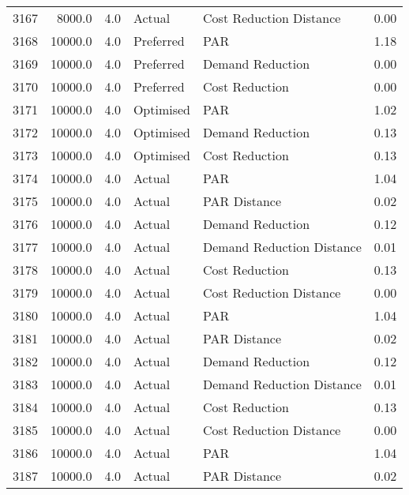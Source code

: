 \begin{longtable}{lrrllr}
3167 &       8000.0 &     4.0 &         Actual &    Cost Reduction Distance &   0.00 \\
3168 &      10000.0 &     4.0 &      Preferred &                        PAR &   1.18 \\
3169 &      10000.0 &     4.0 &      Preferred &           Demand Reduction &   0.00 \\
3170 &      10000.0 &     4.0 &      Preferred &             Cost Reduction &   0.00 \\
3171 &      10000.0 &     4.0 &      Optimised &                        PAR &   1.02 \\
3172 &      10000.0 &     4.0 &      Optimised &           Demand Reduction &   0.13 \\
3173 &      10000.0 &     4.0 &      Optimised &             Cost Reduction &   0.13 \\
3174 &      10000.0 &     4.0 &         Actual &                        PAR &   1.04 \\
3175 &      10000.0 &     4.0 &         Actual &               PAR Distance &   0.02 \\
3176 &      10000.0 &     4.0 &         Actual &           Demand Reduction &   0.12 \\
3177 &      10000.0 &     4.0 &         Actual &  Demand Reduction Distance &   0.01 \\
3178 &      10000.0 &     4.0 &         Actual &             Cost Reduction &   0.13 \\
3179 &      10000.0 &     4.0 &         Actual &    Cost Reduction Distance &   0.00 \\
3180 &      10000.0 &     4.0 &         Actual &                        PAR &   1.04 \\
3181 &      10000.0 &     4.0 &         Actual &               PAR Distance &   0.02 \\
3182 &      10000.0 &     4.0 &         Actual &           Demand Reduction &   0.12 \\
3183 &      10000.0 &     4.0 &         Actual &  Demand Reduction Distance &   0.01 \\
3184 &      10000.0 &     4.0 &         Actual &             Cost Reduction &   0.13 \\
3185 &      10000.0 &     4.0 &         Actual &    Cost Reduction Distance &   0.00 \\
3186 &      10000.0 &     4.0 &         Actual &                        PAR &   1.04 \\
3187 &      10000.0 &     4.0 &         Actual &               PAR Distance &   0.02 \\

\end{longtable}
